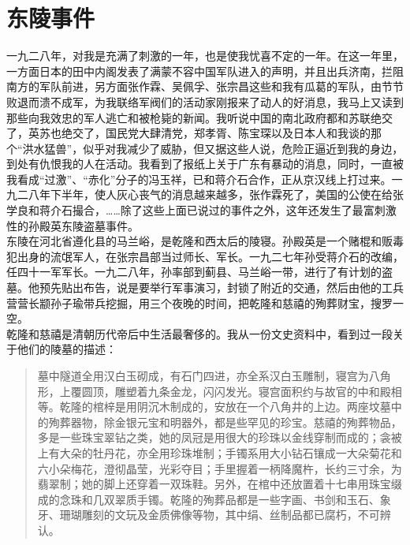 \fancyhead[RO]{} %
\fancyhead[LE]{} %
\chapter*{东陵事件}
\thispagestyle{empty}
一九二八年，对我是充满了刺激的一年，也是使我忧喜不定的一年。在这一年里，一方面日本的田中内阁发表了满蒙不容中国军队进入的声明，并且出兵济南，拦阻南方的军队前进，另方面张作霖、吴佩孚、张宗昌这些和我有瓜葛的军队，由节节败退而溃不成军，为我联络军阀们的活动家刚报来了动人的好消息，我马上又读到那些向我效忠的军人逃亡和被枪毙的新闻。我听说中国的南北政府都和苏联绝交了，英苏也绝交了，国民党大肆清党，郑孝胥、陈宝琛以及日本人和我谈的那个“洪水猛兽”，似乎对我减少了威胁，但又据这些人说，危险正逼近到我的身边，到处有仇恨我的人在活动。我看到了报纸上关于广东有暴动的消息，同时，一直被我看成“过激”、“赤化”分子的冯玉祥，已和蒋介石合作，正从京汉线上打过来。一九二八年下半年，使人灰心丧气的消息越来越多，张作霖死了，美国的公使在给张学良和蒋介石撮合，……除了这些上面已说过的事件之外，这年还发生了最富刺激性的孙殿英东陵盗墓事件。\\

东陵在河北省遵化县的马兰峪，是乾隆和西太后的陵寝。孙殿英是一个赌棍和贩毒犯出身的流氓军人，在张宗昌部当过师长、军长。一九二七年孙受蒋介石的改编，任四十一军军长。一九二八年，孙率部到蓟县、马兰峪一带，进行了有计划的盗墓。他预先贴出布告，说是要举行军事演习，封锁了附近的交通，然后由他的工兵营营长颛孙子瑜带兵挖掘，用三个夜晚的时间，把乾隆和慈禧的殉葬财宝，搜罗一空。\\

乾隆和慈禧是清朝历代帝后中生活最奢侈的。我从一份文史资料中，看到过一段关于他们的陵墓的描述：\\

\begin{quote}
	墓中隧道全用汉白玉砌成，有石门四进，亦全系汉白玉雕制，寝宫为八角形，上覆圆顶，雕塑着九条金龙，闪闪发光。寝宫面积约与故官的中和殿相等。乾隆的棺梓是用阴沉木制成的，安放在一个八角井的上边。两座坟墓中的殉葬器物，除金银元宝和明器外，都是些罕见的珍宝。慈禧的殉葬物品，多是一些珠宝翠钻之类，她的凤冠是用很大的珍珠以金线穿制而成的；衾被上有大朵的牡丹花，亦全用珍珠堆制；手镯系用大小钻石镶成一大朵菊花和六小朵梅花，澄彻晶莹，光彩夺目；手里握着一柄降魔杵，长约三寸余，为翡翠制；她的脚上还穿着一双珠鞋。另外，在棺中还放置着十七串用珠宝缀成的念珠和几双翠质手镯。乾隆的殉葬品都是一些字画、书剑和玉石、象牙、珊瑚雕刻的文玩及金质佛像等物，其中绢、丝制品都已腐朽，不可辨认。\\
\end{quote}

